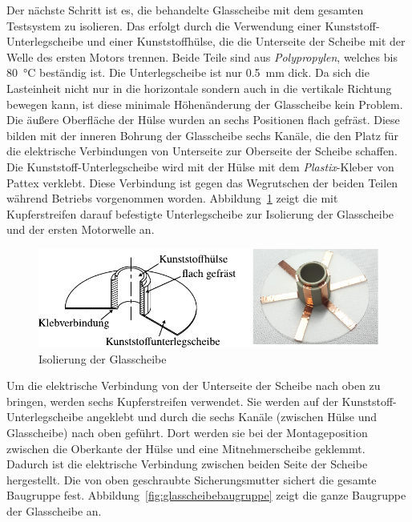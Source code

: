 Der nächste Schritt ist es, die behandelte Glasscheibe mit dem gesamten Testsystem zu isolieren.
Das erfolgt durch die Verwendung einer Kunststoff-Unterlegscheibe und einer Kunststoffhülse, die die Unterseite der Scheibe mit der Welle des ersten Motors trennen.
Beide Teile sind aus \textit{Polypropylen}, welches bis \SI{80}{\degreeCelsius} beständig ist.
Die Unterlegscheibe ist nur \SI{0.5}{\milli\meter} dick.
Da sich die Lasteinheit nicht nur in die horizontale sondern auch in die vertikale Richtung bewegen kann, ist diese minimale Höhenänderung der Glasscheibe kein Problem.
Die äußere Oberfläche der Hülse wurden an sechs Positionen flach gefräst.
Diese bilden mit der inneren Bohrung der Glasscheibe sechs Kanäle, die den Platz für die elektrische Verbindungen von Unterseite zur Oberseite der Scheibe schaffen.
Die Kunststoff-Unterlegscheibe wird mit der Hülse mit dem \textit{Plastix}-Kleber von Pattex verklebt.
Diese Verbindung ist gegen das Wegrutschen der beiden Teilen während Betriebs vorgenommen worden.
Abbildung~\ref{fig:isolierung_der_glassscheibe} zeigt die mit Kupferstreifen darauf befestigte Unterlegscheibe zur Isolierung der Glasscheibe und der ersten Motorwelle an.

\begin{figure}[htb]
    \centering
    \includegraphics[]{./images/isolierung_der_scheibe.pdf}
    \caption{Isolierung der Glasscheibe}
    \label{fig:isolierung_der_glassscheibe}
\end{figure}

Um die elektrische Verbindung von der Unterseite der Scheibe nach oben zu bringen, werden sechs Kupferstreifen verwendet.
Sie werden auf der Kunststoff-Unterlegscheibe angeklebt und durch die sechs Kanäle (zwischen Hülse und Glasscheibe) nach oben geführt.
Dort werden sie bei der Montageposition zwischen die Oberkante der Hülse und eine Mitnehmerscheibe geklemmt.
Dadurch ist die elektrische Verbindung zwischen beiden Seite der Scheibe hergestellt.
Die von oben geschraubte Sicherungsmutter sichert die gesamte Baugruppe fest.
Abbildung~\ref{fig:glasscheibebaugruppe} zeigt die ganze Baugruppe der Glasscheibe an.


